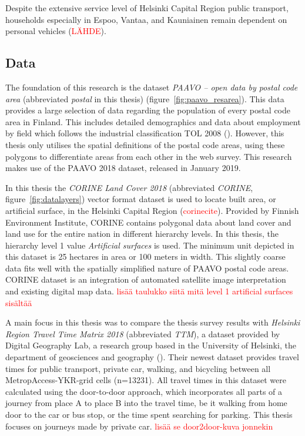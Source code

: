Despite the extensive service level of Helsinki Capital Region public transport, households especially in Espoo, Vantaa, and Kauniainen remain dependent on personal vehicles (\textcolor{red}{LÄHDE}). 

\newpage
\subsection{Data}
\justify

The foundation of this research is the dataset \textit{PAAVO -- open data by postal code area} (abbreviated \textit{postal} in this thesis) (figure~\ref{fig:paavo_resarea}). This data provides a large selection of data regarding the population of every postal code area in Finland. This includes detailed demographics and data about employment by field which follows the industrial classification TOL 2008 (\cite{Tilastokeskus2008}). However, this thesis only utilises the spatial definitions of the postal code areas, using these polygons to differentiate areas from each other in the web survey. This research makes use of the PAAVO 2018 dataset, released in January 2019.

In this thesis the \textit{CORINE Land Cover 2018} (abbreviated \textit{CORINE}, figure~\ref{fig:datalayers}) vector format dataset is used to locate built area, or artificial surface, in the Helsinki Capital Region (\textcolor{red}{corinecite}). Provided by Finnish Environment Institute, CORINE contains polygonal data about land cover and land use for the entire nation in different hierarchy levels. In this thesis, the hierarchy level 1 value \textit{Artificial surfaces} is used. The minimum unit depicted in this dataset is 25 hectares in area or 100 meters in width. This slightly coarse data fits well with the spatially simplified nature of PAAVO postal code areas. CORINE dataset is an integration of automated satellite image interpretation and existing digital map data. \textcolor{red}{lisää taulukko siitä mitä level 1 artificial surfaces sisältää}

A main focus in this thesis was to compare the thesis survey results with \textit{Helsinki Region Travel Time Matrix 2018} (abbreviated \textit{TTM}), a dataset provided by Digital Geography Lab, a research group based in the University of Helsinki, the department of geosciences and geography (\cite{Tenkanen2018}). Their newest dataset provides travel times for public transport, private car, walking, and bicycling between all MetropAccess-YKR-grid cells (n=13231). All travel times in this dataset were calculated using the door-to-door approach, which incorporates all parts of a journey from place A to place B into the travel time, be it walking from home door to the car or bus stop, or the time spent searching for parking. This thesis focuses on journeys made by private car. \textcolor{red}{lisää se door2door-kuva jonnekin}

